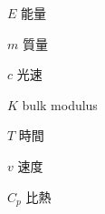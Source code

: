 
\begin{denotation}[3cm]


\item[$E$]{
  能量
}

\item[$m$]{
  質量
}

\item[$c$]{
  光速
}

\item[$K$]{
  bulk modulus
}

\item[$T$]{
  時間
}

\item[$v$]{
  速度
}

\item[$C_p$]{
  比熱
}


\end{denotation}
